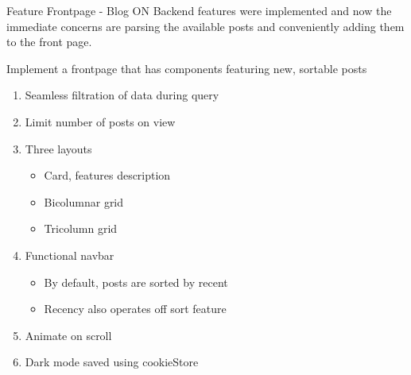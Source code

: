 \documentclass[7px]{article}
\begin{document}
\frontmatter
{Feature}
{Frontpage - Blog}
{ON}
{Backend features were implemented and now the immediate concerns are parsing the available posts and conveniently adding them to the front page.}

\strategy
{Implement a frontpage that has components featuring new, sortable posts}
{
  \begin{enumerate}
    \item Seamless filtration of data during query
    \item Limit number of posts on view
    \item Three layouts
      \small{
        \begin{itemize}[label=$\multimapdotinv$, leftmargin=1.7mm]
          \item Card, features description
          \item Bicolumnar grid
          \item Tricolumn grid
        \end{itemize}
      }
      \normalsize
    \item Functional navbar
      \small{
        \begin{itemize}[label=$\multimapdotinv$, leftmargin=1.7mm]
          \item By default, posts are sorted by recent
          \item Recency also operates off sort feature
        \end{itemize}
      }
    \item Animate on scroll
    \item Dark mode saved using cookieStore
  \end{enumerate}
}
\end{document}
